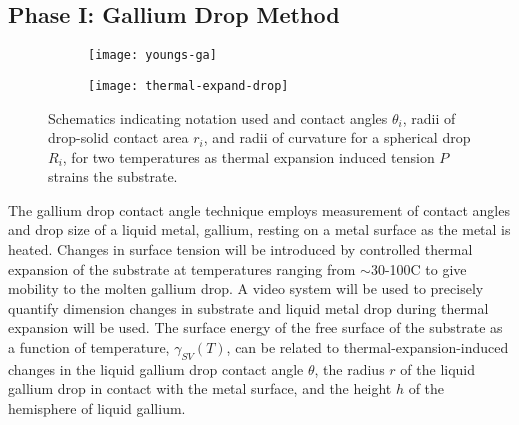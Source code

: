 
\subsection{Phase I: Gallium Drop Method}


\begin{figure}
	\begin{subfigure}[b]{0.5\textwidth}
		\texttt{[image: youngs-ga]}
		\label{fig:youngs-ga}
	\end{subfigure}
	\begin{subfigure}[b]{0.5\textwidth}
		\texttt{[image: thermal-expand-drop]}
		\label{fig:thermal-expand-drop}
	\end{subfigure}
	\caption{Schematics indicating notation used and contact angles $\theta_{i}$, radii of drop-solid contact area $r_{i}$, and radii of curvature for a spherical drop $R_{i}$, for two temperatures as thermal expansion induced tension $P$ strains the substrate.}
	\label{fig:therm-exp-ga}
\end{figure}
The gallium drop contact angle technique employs measurement of contact angles and drop size of a liquid metal, gallium, resting on a metal surface as the metal is heated. Changes in surface tension will be introduced by controlled thermal expansion of the substrate at temperatures ranging from $\sim$30-100\degree C to give mobility to the molten gallium drop.
A video system will be used to precisely quantify dimension changes in substrate and liquid metal drop during thermal expansion will be used. The surface energy of the free surface of the substrate as a function of temperature, $\gamma_{SV}(T)$, can be related to thermal-expansion-induced changes in the liquid gallium drop contact angle $\theta$, the radius $r$ of the liquid gallium drop in contact with the metal surface, and the height $h$ of the hemisphere of liquid gallium. 

